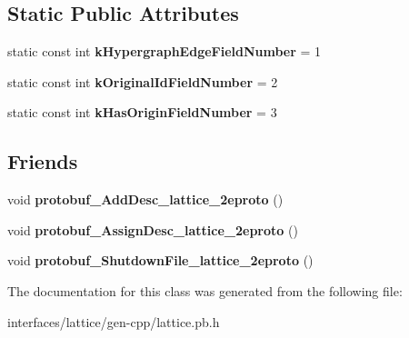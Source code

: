\subsection*{Static Public Attributes}
\begin{DoxyCompactItemize}
\item 
\hypertarget{classlattice_1_1Origin_a740142917cd1a8dc2db9763c768ea4b1}{
static const int {\bfseries kHypergraphEdgeFieldNumber} = 1}
\label{classlattice_1_1Origin_a740142917cd1a8dc2db9763c768ea4b1}

\item 
\hypertarget{classlattice_1_1Origin_abf5fdc243e613de484e2c64b3ccd0f29}{
static const int {\bfseries kOriginalIdFieldNumber} = 2}
\label{classlattice_1_1Origin_abf5fdc243e613de484e2c64b3ccd0f29}

\item 
\hypertarget{classlattice_1_1Origin_acfa669855c716b2399e9b2949fc38986}{
static const int {\bfseries kHasOriginFieldNumber} = 3}
\label{classlattice_1_1Origin_acfa669855c716b2399e9b2949fc38986}

\end{DoxyCompactItemize}
\subsection*{Friends}
\begin{DoxyCompactItemize}
\item 
\hypertarget{classlattice_1_1Origin_a19e63fb37025879e023cad88064187cf}{
void {\bfseries protobuf\_\-AddDesc\_\-lattice\_\-2eproto} ()}
\label{classlattice_1_1Origin_a19e63fb37025879e023cad88064187cf}

\item 
\hypertarget{classlattice_1_1Origin_a3b0386e09a9fefcf1bdce658cfc480b2}{
void {\bfseries protobuf\_\-AssignDesc\_\-lattice\_\-2eproto} ()}
\label{classlattice_1_1Origin_a3b0386e09a9fefcf1bdce658cfc480b2}

\item 
\hypertarget{classlattice_1_1Origin_a3c7b187721d0704ceb19ff889729d35a}{
void {\bfseries protobuf\_\-ShutdownFile\_\-lattice\_\-2eproto} ()}
\label{classlattice_1_1Origin_a3c7b187721d0704ceb19ff889729d35a}

\end{DoxyCompactItemize}


The documentation for this class was generated from the following file:\begin{DoxyCompactItemize}
\item 
interfaces/lattice/gen-\/cpp/lattice.pb.h\end{DoxyCompactItemize}
